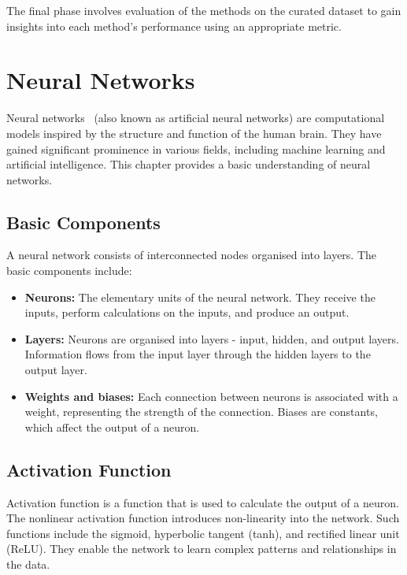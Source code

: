 \documentclass[english, ba, kiv, he, iso690numb, pdf, viewonly]{fasthesis}
\begin{document}
The final phase involves evaluation of the methods on the curated dataset to gain insights into each method's performance using an appropriate metric.


%
%
%
%
\chapter{Neural Networks}
Neural networks~\cite{goodfellow2016deep} (also known as artificial neural networks) are computational models inspired by the structure and function of the human brain. They have gained significant prominence in various fields, including machine learning and artificial intelligence. This chapter provides a basic understanding of neural networks.

\section{Basic Components}

A neural network consists of interconnected nodes organised into layers. The basic components include:

\begin{itemize}
    \item \textbf{Neurons:} The elementary units of the neural network. They receive the inputs, perform calculations on the inputs, and produce an output.
    
    \item \textbf{Layers:} Neurons are organised into layers - input, hidden, and output layers. Information flows from the input layer through the hidden layers to the output layer.
    
    \item \textbf{Weights and biases:} Each connection between neurons is associated with a weight, representing the strength of the connection. Biases are constants, which affect the output of a neuron.
\end{itemize}
\section{Activation Function}

Activation function is a function that is used to calculate the output of a neuron. The nonlinear activation function introduces non-linearity into the network. Such functions include the sigmoid, hyperbolic tangent (tanh), and rectified linear unit (ReLU). They enable the network to learn complex patterns and relationships in the data.
\end{document}
